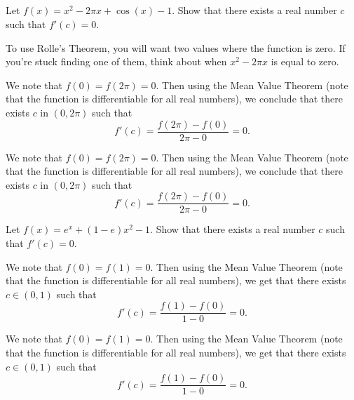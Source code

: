\subsection*{\Procedural}

\begin{Mquestion}[2015Q] Let $f(x)=x^2-2\pi x+ \cos(x)-1$. Show that there exists a real number $c$ such that $f'(c)=0$.
\end{Mquestion}
\begin{hint} To use Rolle's Theorem, you will want two values where the function is zero. If you're stuck finding one of them, think about when $x^2-2\pi x$ is equal to zero.
\end{hint}
\begin{answer} We note that $f(0)=f(2\pi)=0$. Then using the Mean Value Theorem (note that the function is differentiable for all real numbers), we conclude that there exists $c$ in $(0,2\pi)$ such that
$$f'(c)=\frac{f(2\pi)- f(0)}{2\pi - 0} = 0.$$
\end{answer}
\begin{solution} We note that $f(0)=f(2\pi)=0$. Then using the Mean Value Theorem (note that the function is differentiable for all real numbers), we conclude that there exists $c$ in $(0,2\pi)$ such that
$$f'(c)=\frac{f(2\pi)- f(0)}{2\pi - 0} = 0.$$
\end{solution}



\begin{question}[2015Q]
Let $f(x)=e^x + (1-e)x^2 - 1$. Show that there exists a real number $c$ such that $f'(c)=0$.
\end{question}
\begin{answer}
We note that $f(0)=f(1)=0$. Then using the Mean Value Theorem (note that the function is differentiable for all real numbers), we get that there exists $c\in (0,1)$ such that
$$f'(c)=\frac{f(1)- f(0)}{1 - 0} = 0.$$
\end{answer}
\begin{solution}
We note that $f(0)=f(1)=0$. Then using the Mean Value Theorem (note that the function is differentiable for all real numbers), we get that there exists $c\in (0,1)$ such that
$$f'(c)=\frac{f(1)- f(0)}{1 - 0} = 0.$$
\end{solution}


